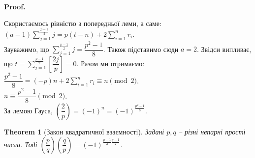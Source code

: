\documentclass[a4paper, 14pt]{extarticle}
\makeatletter
\theoremstyle{theoremdd}
\newtheorem{theorem}{Theorem}[subsection]
\theoremstyle{theoremdd}
\theoremstyle{theoremdd}
\theoremstyle{theoremdd}
\theoremstyle{theoremdd}
\theoremstyle{theoremdd}
\theoremstyle{theoremdd}
\theoremstyle{theoremdd}
\def\qed{$\blacksquare$}
\renewenvironment{proof}[1][Proof.\\]{\par
\pushQED{\hfill \qed}%
\normalfont \topsep6\p@\@plus6\p@\relax
\trivlist
\item\relax
{\bfseries
#1\@addpunct{.}}\hspace\labelsep\ignorespaces
}{%
\popQED\endtrivlist\@endpefalse
}
\makeatother
\begin{document}
\begin{proof}
Скористаємось рівністю з попередньої леми, а саме:\\
$\displaystyle (a-1)\sum_{j=1}^{\frac{p-1}{2}}j = p(t-n)+2 \sum_{i=1}^n r_i$.\\
Зауважимо, що $\displaystyle\sum_{j=1}^{\frac{p-1}{2}} j = \dfrac{p^2-1}{8}$. Також підставимо сюди $a = 2$. Звідси випливає, що $t = \displaystyle\sum_{j=1}^{\frac{p-1}{2}} \left[ \dfrac{2j}{p} \right] = 0$. Разом ми отримаємо:\\
$\dfrac{p^2-1}{8} = (-p)n + 2 \displaystyle\sum_{i=1}^n r_i \equiv n \pmod 2$.\\
$n \equiv \dfrac{p^2-1}{8} \pmod 2$.\\
За лемою Гауса, $\left( \dfrac{2}{p} \right) = (-1)^n = (-1)^{\textstyle\frac{p^2-1}{8}} $.
\end{proof}

\begin{theorem}[Закон квадратичної взаємності]
Задані $p,q$ -- різні непарні прості числа. Тоді $\left( \dfrac{p}{q} \right) \left( \dfrac{q}{p} \right) = (-1)^{\textstyle\frac{p-1}{2} \frac{q-1}{2}}$.
\end{theorem}
\end{document}
